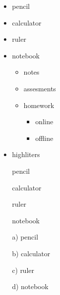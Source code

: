 \documentclass[11pt]{article}
\begin{document}
	
	
	\pagebreak
	
	\begin{itemize}
	
		\item pencil
		\item calculator
		\item ruler
		\item notebook
		
			\begin{itemize}
				\item notes
				\item assesments				
				\item homework
				
					\begin{itemize}
					
						\item online
						\item offline

					\end{itemize}
					
			\end{itemize}
	
		\item highliters

	\end{itemize}
	
	\vspace{2px}
	
	\begin{enumerate}
		
		\item[] pencil
		\item[] calculator
		\item[] ruler
		\item[] notebook
	
	\end{enumerate}
	
	\vspace{2px}
	
	\begin{enumerate}
		
		\item[a)] pencil
		\item[b)] calculator
		\item[c)] ruler
		\item[d)] notebook
	
	\end{enumerate}


	
	
	
	
	
	
	
	
	
	
	
	
	
	
	
	
	
	
	
	
	
	
	
	
	
	
	
		
	
	
\end{document}
